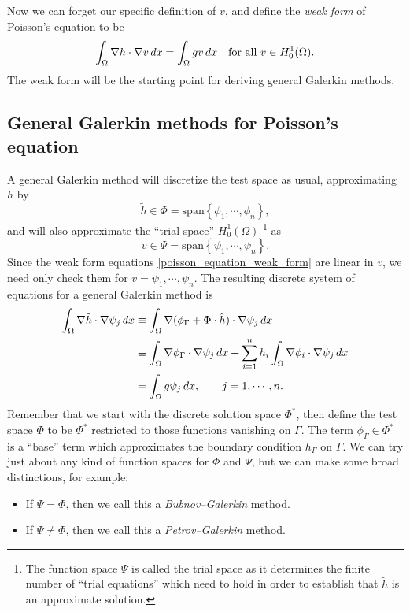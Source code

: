 Now we can forget our specific definition of $v$, and define the \textit{weak form} of Poisson's equation to be
\begin{equation}\label{poisson_equation_weak_form}
    \int_\Omega \nabla h \cdot \nabla v \,dx = \int_\Omega gv\,dx \text{\quad for all $v \in H^1_0(\Omega)$}.
\end{equation}
The weak form will be the starting point for deriving general Galerkin methods.

\subsection{General Galerkin methods for Poisson's equation}
A general Galerkin method will discretize the test space as usual, approximating $h$ by
$$\tilde{h} \in \Phi = \text{span}\left\{\phi_1, \cdots, \phi_n\right\},$$
and will also approximate the ``trial space'' $H^1_0(\Omega)$
\footnote{The function space $\Psi$ is called the trial space as it determines the finite number of ``trial equations'' which need to hold in order
           to establish that $\tilde{h}$ is an approximate solution.}
as
    $$v \in \Psi = \text{span}\left\{\psi_1, \cdots, \psi_n\right\}.$$
Since the weak form equations \eqref{poisson_equation_weak_form} are linear in $v$, we need only check them for $v=\psi_1,\cdots,\psi_n$.
The resulting discrete system of equations for a general Galerkin method is
\begin{equation}\label{poisson_galerkin_system}
\begin{split}
    \int_\Omega \nabla\tilde{h}\cdot \nabla\psi_j\,dx
        &\equiv \int_\Omega \nabla(\phi_\Gamma + \Phi\cdot\hat{h})\cdot \nabla\psi_j\,dx \\
    &\equiv \int_\Omega \nabla\phi_\Gamma \cdot \nabla\psi_j\,dx + \sum_{i=1}^n h_i\int_\Omega \nabla\phi_i\cdot \nabla\psi_j\,dx\\
    &= \int_\Omega g\psi_j\,dx,
        \text{\quad\quad $j = 1,\cdots,n$}.
\end{split}
\end{equation}
Remember that we start with the discrete solution space $\Phi^*$, then define the test space $\Phi$ to be $\Phi^*$ restricted to those functions vanishing on $\Gamma$.
The term $\phi_\Gamma \in \Phi^*$ is a ``base'' term which approximates the boundary condition $h_\Gamma$ on $\Gamma$.
We can try just about any kind of function spaces for $\Phi$ and $\Psi$, but we can make some broad distinctions, for example:
\begin{itemize}
    \item If $\Psi = \Phi$, then we call this a \textit{Bubnov--Galerkin} method.
    \item If $\Psi \neq \Phi$, then we call this a \textit{Petrov--Galerkin} method.
\end{itemize}
